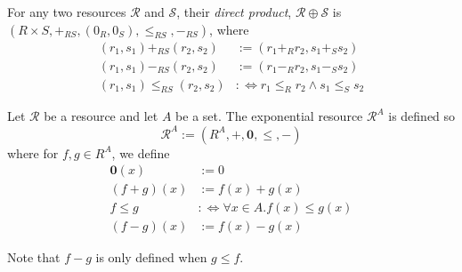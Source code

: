 \documentclass[10pt]{article}
\begin{document}
\begin{definition}
    For any two resources $\mathcal{R}$ and $\mathcal{S}$, their \emph{direct product}, $\mathcal{R} \oplus \mathcal{S}$ is $(R \times S, +_{RS}, (0_R, 0_S), \leq_{RS}, -_{RS})$, where
    \begin{align*}
        (r_1, s_1) +_{RS} (r_2, s_2) &:= (r_1 +_R r_2, s_1 +_S s_2) \\
        (r_1, s_1) -_{RS} (r_2, s_2) &:= (r_1 -_R r_2, s_1 -_S s_2) \\
        (r_1, s_1) \leq_{RS} (r_2, s_2) &:\iff r_1 \leq_R r_2 \land s_1 \leq_S s_2
    \end{align*}
\end{definition}

\begin{definition}
    Let $\mathcal{R}$ be a resource and let $A$ be a set.
    The exponential resource $\mathcal{R}^A$  is defined so
    \[
        \mathcal{R}^A := (R^A, +, \bm{0}, \leq, -)
    \]
    where for $f,g \in R^A$, we define
    \begin{align*}
        \bm{0}(x) &:= 0 \\
        (f + g)(x) &:= f(x) + g(x) \\
        f \leq g &:\Leftrightarrow \forall x \in A. f(x) \leq g(x) \\
        (f - g)(x) &:= f(x) - g(x)
    \end{align*}

    Note that $f - g$ is only defined when $g \leq f$.
\end{definition}
\end{document}
